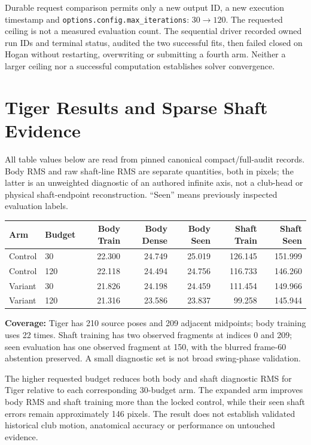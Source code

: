 \documentclass[11pt,letterpaper]{article}
\newcommand{\code}[1]{\nolinkurl{#1}}\newcommand{\hash}[1]{{\footnotesize\nolinkurl{#1}}}
\begin{document}
Durable request comparison permits only a new output ID, a new execution timestamp
and \code{options.config.max_iterations}: $30\rightarrow120$.
The requested ceiling is not a measured evaluation count. The sequential driver
recorded owned run IDs and terminal status, audited the two successful fits, then
failed closed on Hogan without restarting, overwriting or submitting a fourth arm.
Neither a larger ceiling nor a successful computation establishes solver convergence.
\newpage
\section{Tiger Results and Sparse Shaft Evidence}
All table values below are read from pinned canonical compact/full-audit records.
Body RMS and raw shaft-line RMS are separate quantities, both in pixels; the latter
is an unweighted diagnostic of an authored infinite axis, not a club-head or physical
shaft-endpoint reconstruction. ``Seen'' means previously inspected evaluation labels.

\begin{center}\small
\begin{tabular}{@{}llrrrrr@{}}\toprule
Arm & Budget & Body Train & Body Dense & Body Seen & Shaft Train & Shaft Seen\\\midrule
Control & 30 & 22.300 & 24.749 & 25.019 & 126.145 & 151.999 \\
Control & 120 & 22.118 & 24.494 & 24.756 & 116.733 & 146.260 \\
Variant & 30 & 21.826 & 24.198 & 24.459 & 111.454 & 149.966 \\
Variant & 120 & 21.316 & 23.586 & 23.837 & 99.258 & 145.944 \\
\bottomrule\end{tabular}
\end{center}
\textbf{Coverage:} Tiger has 210 source poses and 209 adjacent midpoints; body
training uses 22 times. Shaft training has two observed fragments at indices 0 and
209; seen evaluation has one observed fragment at 150, with the blurred frame-60
abstention preserved. A small diagnostic set is not broad swing-phase validation.

The higher requested budget reduces both body and shaft diagnostic RMS for Tiger
relative to each corresponding 30-budget arm. The expanded arm improves body RMS
and shaft training more than the locked control, while their seen shaft errors remain
approximately 146 pixels. The result does not establish validated historical club
motion, anatomical accuracy or performance on untouched evidence.
\end{document}
